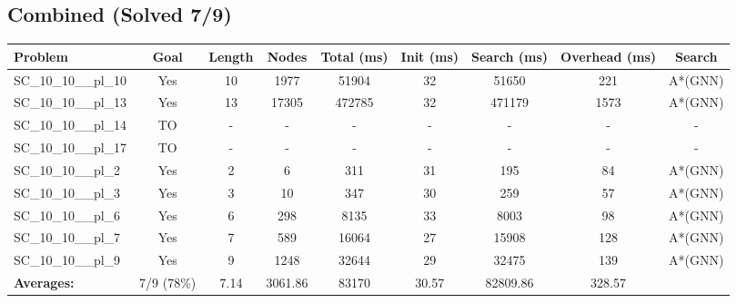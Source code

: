\documentclass{article}
\begin{document}
\subsection*{Combined (Solved 7/9)}
\begin{tabular}{lcccccccc}
\toprule
Problem & Goal & Length & Nodes & Total (ms) & Init (ms) & Search (ms) & Overhead (ms) & Search \\
\midrule
SC\_10\_10\_\_pl\_10 & Yes & 10 & 1977 & 51904 & 32 & 51650 & 221 & A*(GNN) \\
SC\_10\_10\_\_pl\_13 & Yes & 13 & 17305 & 472785 & 32 & 471179 & 1573 & A*(GNN) \\
SC\_10\_10\_\_pl\_14 & TO & - & - & - & - & - & - & - \\
SC\_10\_10\_\_pl\_17 & TO & - & - & - & - & - & - & - \\
SC\_10\_10\_\_pl\_2 & Yes & 2 & 6 & 311 & 31 & 195 & 84 & A*(GNN) \\
SC\_10\_10\_\_pl\_3 & Yes & 3 & 10 & 347 & 30 & 259 & 57 & A*(GNN) \\
SC\_10\_10\_\_pl\_6 & Yes & 6 & 298 & 8135 & 33 & 8003 & 98 & A*(GNN) \\
SC\_10\_10\_\_pl\_7 & Yes & 7 & 589 & 16064 & 27 & 15908 & 128 & A*(GNN) \\
SC\_10\_10\_\_pl\_9 & Yes & 9 & 1248 & 32644 & 29 & 32475 & 139 & A*(GNN) \\
\textbf{Averages:} & 7/9 (78\%) & 7.14 & 3061.86 & 83170 & 30.57 & 82809.86 & 328.57 & \\
\bottomrule
\end{tabular}
\\[0.7cm]
\end{document}
